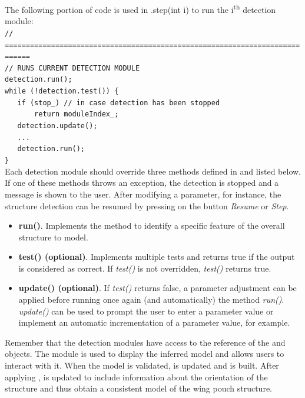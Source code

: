 The following portion of code is used in \StructureDetector.step(int i) to run the i\textsuperscript{th} detection module:\\

\footnotesize\texttt{// ============================================================================\\
// RUNS CURRENT DETECTION MODULE\\
detection.run();\\
while (!detection.test()) \{\\
\indent \ \ \ if (stop\_) // in case detection has been stopped\\
\indent \ \ \ \ \ \ \ return moduleIndex\_;\\
\indent \ \ \ detection.update();\\
\indent \ \ \ ...\\
\indent \ \ \ detection.run();\\
\}}\normalsize\\

Each detection module should override three methods defined in \StructureDetectionModule and listed below. If one of these methods throws an exception, the detection is stopped and a message is shown to the user. After modifying a parameter, for instance, the structure detection can be resumed by pressing on the button \textit{Resume} or \textit{Step}.

\begin{itemize}
 \item \textbf{run()}. Implements the method to identify a specific feature of the overall structure to model.
 \item \textbf{test() (optional)}. Implements multiple tests and returns true if the output is considered as correct. If \emph{test()} is not overridden, \emph{test()} returns true.
 \item \textbf{update() (optional)}. If \emph{test()} returns false, a parameter adjustment can be applied before running once again (and automatically) the method \emph{run()}. \emph{update()} can be used to prompt the user to enter a parameter value or implement an automatic incrementation of a parameter value, for example.
\end{itemize}

Remember that the detection modules have access to the reference of the \WPouchStructureDetector and \WPouchStructure objects. The module \InteractiveStructure is used to display the inferred model and allows users to interact with it. When the model is validated, \WPouchStructureSnake is updated and \WPouchStructure is built. After applying \WPouchOrientationDetection, \WPouchStructure is updated to include information about the orientation of the structure and thus obtain a consistent model of the wing pouch structure.


